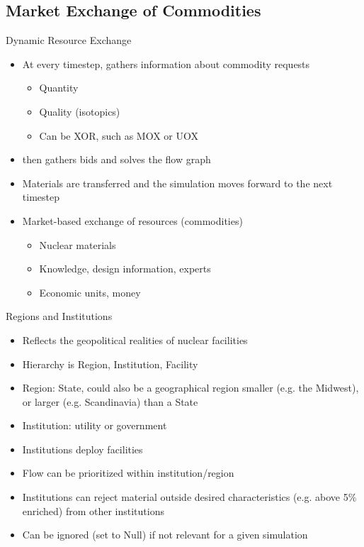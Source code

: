 \subsection{Market Exchange of Commodities}
\begin{frame}{Dynamic Resource Exchange}
\begin{itemize}
    \item At every timestep, \Cyclus gathers information about commodity requests
    \begin{itemize}
        \item Quantity
        \item Quality (isotopics)
        \item Can be XOR, such as MOX or UOX
    \end{itemize}
    \item \Cyclus then gathers bids and solves the flow graph
    \item Materials are transferred and the simulation moves forward to the next timestep
    \item Market-based exchange of resources (commodities)
    \begin{itemize}
        \item Nuclear materials
        \item Knowledge, design information, experts
        \item Economic units, money
    \end{itemize}
\end{itemize}
\end{frame}

\begin{frame}{Regions and Institutions}
    \begin{itemize}
        \item Reflects the geopolitical realities of nuclear facilities 
        \item Hierarchy is Region, Institution, Facility
        \item Region: State, could also be a geographical region smaller (e.g. the Midwest), or larger (e.g. Scandinavia) than a State 
        \item Institution: utility or government
        \item Institutions deploy facilities
        \item Flow can be prioritized within institution/region
        \item Institutions can reject material outside desired characteristics (e.g. above 5\% enriched) from other institutions
        \item Can be ignored (set to Null) if not relevant for a given simulation
    \end{itemize}
\end{frame}


